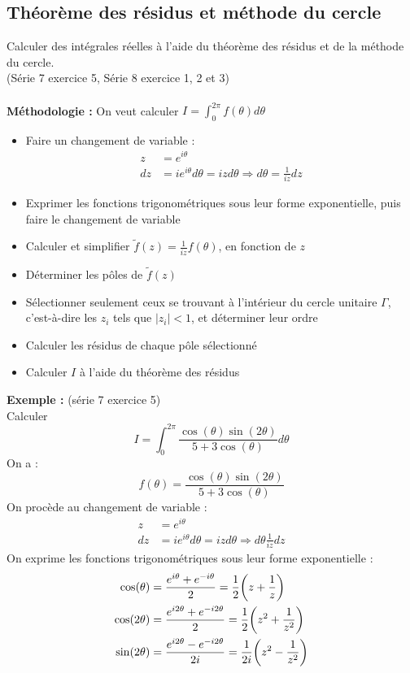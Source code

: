 \subsection{Théorème des résidus et méthode du cercle}
Calculer des intégrales réelles à l’aide du théorème des résidus et de la méthode du cercle. \\
(Série 7 exercice 5, Série 8 exercice 1, 2 et 3) \\
\\
\textbf{Méthodologie :} On veut calculer $I = \int_0^{2\pi} f(\theta) d\theta$
\begin{itemize}
    \item Faire un changement de variable :
    \begin{align*}
        z &= e^{i\theta} \\
        dz &= ie^{i\theta}d\theta = izd\theta \Rightarrow d\theta = \frac{1}{iz}dz
    \end{align*}
    \item Exprimer les fonctions trigonométriques sous leur forme exponentielle, puis faire le changement de variable
    \item Calculer et simplifier $\widetilde{f}(z) = \frac{1}{iz}f(\theta)$, en fonction de $z$
    \item Déterminer les pôles de $\widetilde{f}(z)$
    \item Sélectionner seulement ceux se trouvant à l'intérieur du cercle unitaire $\Gamma$, c'est-à-dire les $z_i$ tels que $|z_i| < 1$, et déterminer leur ordre
    \item Calculer les résidus de chaque pôle sélectionné
    \item Calculer $I$ à l'aide du théorème des résidus
\end{itemize}
\textbf{Exemple :} (série 7 exercice 5) \\
Calculer
$$I = \int_0^{2\pi} \frac{\cos(\theta)\sin(2\theta)}{5 + 3\cos(\theta)}d\theta$$
On a :
$$f(\theta) = \frac{\cos(\theta)\sin(2\theta)}{5 + 3\cos(\theta)}$$
On procède au changement de variable :
\begin{align*}
    z &= e^{i\theta} \\
    dz &= ie^{i\theta}d\theta = izd\theta \Rightarrow d\theta
    \frac{1}{iz}dz
\end{align*}
On exprime les fonctions trigonométriques sous leur forme exponentielle :
\begin{align*}
    \cos(\theta) &= \frac{e^{i\theta} + e^{-i\theta}}{2} = \frac{1}{2}\bigg{(}z + \frac{1}{z}\bigg{)} \\
    \cos(2\theta) &= \frac{e^{i2\theta} + e^{-i2\theta}}{2} = \frac{1}{2}\bigg{(}z^2 + \frac{1}{z^2}\bigg{)} \\
    \sin(2\theta) &= \frac{e^{i2\theta} - e^{-i2\theta}}{2i} = \frac{1}{2i}\bigg{(}z^2 - \frac{1}{z^2}\bigg{)}
\end{align*}
